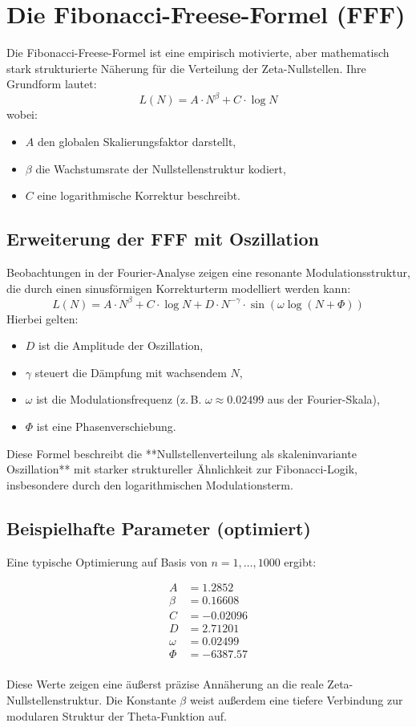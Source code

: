 \section{Die Fibonacci-Freese-Formel (FFF)}

Die Fibonacci-Freese-Formel ist eine empirisch motivierte, aber mathematisch stark strukturierte Näherung für die Verteilung der Zeta-Nullstellen. Ihre Grundform lautet:
\[
L(N) = A \cdot N^{\beta} + C \cdot \log N
\]
wobei:
\begin{itemize}[label=\textbullet]
    \item \( A \) den globalen Skalierungsfaktor darstellt,
    \item \( \beta \) die Wachstumsrate der Nullstellenstruktur kodiert,
    \item \( C \) eine logarithmische Korrektur beschreibt.
\end{itemize}

\subsection{Erweiterung der FFF mit Oszillation}

Beobachtungen in der Fourier-Analyse zeigen eine resonante Modulationsstruktur, die durch einen sinusförmigen Korrekturterm modelliert werden kann:
\[
L(N) = A \cdot N^{\beta} + C \cdot \log N + D \cdot N^{-\gamma} \cdot \sin\left(\omega \log(N + \Phi)\right)
\]
Hierbei gelten:
\begin{itemize}[label=\textbullet]
    \item \( D \) ist die Amplitude der Oszillation,
    \item \( \gamma \) steuert die Dämpfung mit wachsendem \( N \),
    \item \( \omega \) ist die Modulationsfrequenz (z.\,B. \( \omega \approx 0.02499 \) aus der Fourier-Skala),
    \item \( \Phi \) ist eine Phasenverschiebung.
\end{itemize}

Diese Formel beschreibt die **Nullstellenverteilung als skaleninvariante Oszillation** mit starker struktureller Ähnlichkeit zur Fibonacci-Logik, insbesondere durch den logarithmischen Modulationsterm.

\subsection{Beispielhafte Parameter (optimiert)}

Eine typische Optimierung auf Basis von \( n = 1,\dots,1000 \) ergibt:

\begin{align*}
A &= 1.2852 \\
\beta &= 0.16608 \\
C &= -0.02096 \\
D &= 2.71201 \\
\omega &= 0.02499 \\
\Phi &= -6387.57 \\
\end{align*}

Diese Werte zeigen eine äußerst präzise Annäherung an die reale Zeta-Nullstellenstruktur. Die Konstante \( \beta \) weist außerdem eine tiefere Verbindung zur modularen Struktur der Theta-Funktion auf.